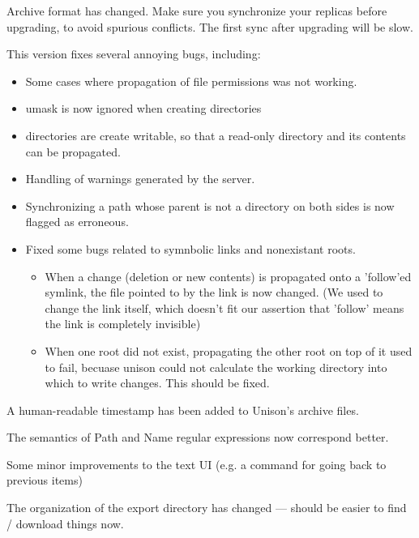 \begin{changesfromversion}{1.219}
\item \incompatible{} Archive format has changed.  Make sure you
synchronize your replicas before upgrading, to avoid spurious
conflicts.  The first sync after upgrading will be slow.

\item This version fixes several annoying bugs, including:
\begin{itemize}
\item Some cases where propagation of file permissions was not
working.
\item umask is now ignored when creating directories
\item directories are create writable, so that a read-only directory and
    its contents can be propagated.
\item Handling of warnings generated by the server.
\item Synchronizing a path whose parent is not a directory on both sides is
now flagged as erroneous.  
\item Fixed some bugs related to symnbolic links and nonexistant roots.
\begin{itemize}
\item 
   When a change (deletion or new contents) is propagated onto a 
     'follow'ed symlink, the file pointed to by the link is now changed.
     (We used to change the link itself, which doesn't fit our assertion
     that 'follow' means the link is completely invisible)
   \item When one root did not exist, propagating the other root on top of it
     used to fail, becuase unison could not calculate the working directory
     into which to write changes.  This should be fixed.
\end{itemize}
\end{itemize}

\item A human-readable timestamp has been added to Unison's archive files.

\item The semantics of Path and Name regular expressions now
correspond better. 

\item Some minor improvements to the text UI (e.g. a command for going
back to previous items)

\item The organization of the export directory has changed --- should
be easier to find / download things now.
\end{changesfromversion}

